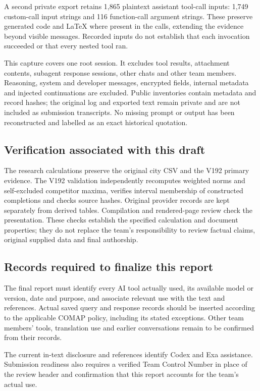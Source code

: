 A second private export retains 1,865 plaintext assistant tool-call inputs:
1,749 custom-call input strings and 116 function-call argument strings.
These preserve generated code and LaTeX where present in the calls, extending
the evidence beyond visible messages. Recorded inputs do not establish that
each invocation succeeded or that every nested tool ran.

This capture covers one root session. It excludes tool results, attachment
contents, subagent response sessions, other chats and other team members.
Reasoning, system and developer messages, encrypted fields, internal metadata
and injected continuations are excluded. Public inventories contain metadata
and record hashes; the original log and exported text remain private and are
not included as submission transcripts. No missing prompt or output has been
reconstructed and labelled as an exact historical quotation.

\subsection*{Verification associated with this draft}
The research calculations preserve the original city CSV and the V192 primary
evidence. The V192 validation independently recomputes weighted norms and
self-excluded competitor maxima, verifies interval membership of constructed
completions and checks source hashes. Original provider records are kept
separately from derived tables. Compilation and rendered-page review check the
presentation. These checks establish the specified calculation and document
properties; they do not replace the team's responsibility to review factual
claims, original supplied data and final authorship.

\subsection*{Records required to finalize this report}
The final report must identify every AI tool actually used, its available
model or version, date and purpose, and associate relevant use with the text
and references. Actual saved query and response records should be inserted
according to the applicable COMAP policy, including its stated exceptions.
Other team members' tools, translation use and earlier conversations remain
to be confirmed from their records.

The current in-text disclosure and references identify Codex and Exa
assistance. Submission readiness also requires a verified Team Control Number
in place of the review header and confirmation that this report accounts for
the team's actual use.
